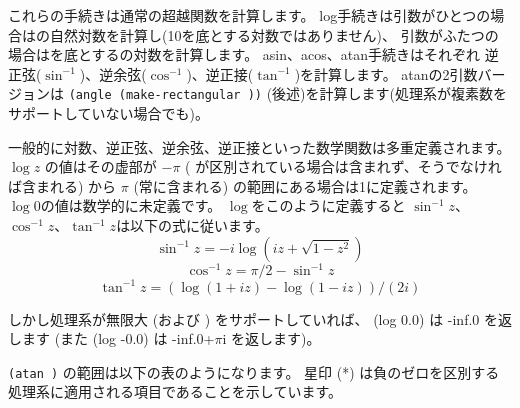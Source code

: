 \begin{entry}{%
}

これらの手続きは通常の超越関数を計算します。
{\cf log}手続きは引数がひとつの場合はの自然対数を計算し(10を底とする対数ではありません)、
引数がふたつの場合はを底とするの対数を計算します。
{\cf asin}、{\cf acos}、{\cf atan}手続きはそれぞれ
逆正弦($\sin^{-1}$)、逆余弦($\cos^{-1}$)、逆正接($\tan^{-1}$)を計算します。
{\cf atan}の2引数バージョンは
{\tt (angle (make-rectangular  ))}
(後述)を計算します(処理系が複素数をサポートしていない場合でも)。

一般的に対数、逆正弦、逆余弦、逆正接といった数学関数は多重定義されます。
$\log z$ の値はその虚部が $-\pi$ ({} が区別されている場合は含まれず、そうでなければ含まれる)
から $\pi$ (常に含まれる) の範囲にある場合は1に定義されます。
$\log 0$の値は数学的に未定義です。
$\log$をこのように定義すると
$\sin^{-1} z$、$\cos^{-1} z$、$\tan^{-1} z$は以下の式に従います。
$$\sin^{-1} z = -i \log (i z + \sqrt{1 - z^2})$$
$$\cos^{-1} z = \pi / 2 - \sin^{-1} z$$
$$\tan^{-1} z = (\log (1 + i z) - \log (1 - i z)) / (2 i)$$

しかし処理系が無限大 (および {}) をサポートしていれば、
{\cf (log 0.0)} は {\cf -inf.0} を返します
(また {\cf (log -0.0)} は {\cf -inf.0+$\pi$i} を返します)。

\texttt{({\cf atan}  )} の範囲は以下の表のようになります。
星印 (*) は負のゼロを区別する処理系に適用される項目であることを示しています。


\end{entry}
